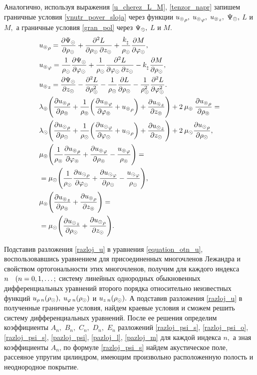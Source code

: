 Аналогично, используя выражения \eqref{u_cherez_L_M}, \eqref{tenzor_napr} запишем граничные условия \eqref{vnutr_pover_sloja} через функции ${u_\circledcirc}_\rho,$ ${u_\circledcirc}_\varphi,$ ${u_\circledcirc}_z,$ $ \Psi_\odot,$ $L$ и $M ,$ а граничные условия \eqref{gran_pol} через $\Psi_\odot,$ $L$ и $M.$
\begin{align}
&{u_\circledcirc}_\rho=\frac{\partial \Psi_\odot}{\partial\rho_\odot}+\frac{\partial^2 L}{\partial\rho_\odot\:\partial z_\odot}+\frac{k_{_\updownarrow}}{\rho_\odot}\frac{\partial M}{\partial \varphi_\odot},\\
&{u_\circledcirc}_\varphi=\frac{1}{\rho_\odot}\frac{\partial \Psi_\odot}{\partial \varphi_\odot}+\frac{1}{\rho_\odot}\frac{\partial^{2} L}{\partial\varphi_\odot\: \partial z_\odot}-k_{_\updownarrow}\frac{\partial M}{\partial \rho_\odot},\\
&{u_\circledcirc}_z=\frac{\partial\Psi_\odot}{\partial z_\odot}-\frac{\partial^{2} L}{\partial \rho^2_\odot}-\frac{1}{\rho_\odot}\frac{\partial L}{\partial \rho_\odot}-\frac{1}{\rho^2_\odot}\frac{\partial^2L}{\partial\varphi^2_\odot}.\\
&\lambda_\circledcirc\Biggl(\frac{\partial {u_\circledcirc}_{\rho}}{\partial \rho_\circledcirc}+\frac{1}{\rho_\circledcirc}\biggl(\frac{\partial {u_\circledcirc}_\varphi}{\partial\varphi_\circledcirc}+{u_\circledcirc}_{\rho}\biggr)+\frac{\partial {u_\circledcirc}_z}{\partial z_\circledcirc}\Biggr)+2\:\mu_\circledcirc\:\frac{\partial {u_\circledcirc}_{\rho}}{\partial \rho_\circledcirc}=\\
&\lambda_\odot\Biggl(\frac{\partial {u_\odot}_{\rho}}{\partial \rho_\odot}+\frac{1}{\rho_\odot}\biggl(\frac{\partial {u_\odot}_{\varphi}}{\partial\varphi_\odot}+{u_\odot}_{\rho}\biggr)+\frac{\partial {u_\odot}_{z}}{\partial z_\odot}\Biggr)+2\:\mu_\odot\frac{\partial {u_\odot}_{\rho}}{\partial \rho_\odot},\\
&\mu_\circledcirc\Biggl(\frac{1}{\rho_\circledcirc}\frac{\partial {u_\circledcirc}_{\rho}}{\partial\varphi_\circledcirc}+\frac{\partial {u_\circledcirc}_{\varphi}}{\partial \rho_\circledcirc}-\frac{{u_\circledcirc}_{\varphi}}{\rho_\circledcirc}\Biggr)=\\
&=\mu_\odot\Biggl(\frac{1}{\rho_\odot}\frac{\partial {u_\odot}_{\rho}}{\partial\varphi_\odot}+\frac{\partial {u_\odot}_{\varphi}}{\partial \rho_\odot}-\frac{{u_\odot}_{\varphi}}{\rho_\odot}\Biggr),\\
&\mu_\circledcirc\Biggl(\frac{\partial {u_\circledcirc}_z}{\partial \rho_\circledcirc}+\frac{\partial {u_\circledcirc}_{\rho}}{\partial z_\circledcirc}\Biggr)=\\
&=\mu_\odot\Biggl(\frac{\partial {u_\odot}_{z}}{\partial \rho_\odot}+\frac{\partial {u_\odot}_{\rho}}{\partial z_\odot}\Biggr).
\end{align}

Подставив разложения \eqref{razloj_u} в уравнения \eqref{equation_otn_u}, воспользовавшись уравнением для присоединенных многочленов Лежандра и свойством ортогональности этих многочленов, получим для каждого индекса $n \quad(n = 0,1,\ldots;$ систему линейных однородных обыкновенных дифференциальных уравнений второго порядка относительно неизвестных функций $u_{\rho\:n}(\rho_\odot),$ $u_{\varphi\:n}(\rho_\odot)$ и $u_{z\:n}(\rho_\odot).$ А подставив разложения \eqref{razloj_u} в полученные граничные условия, найдем краевые условия и сможем решить  систему дифференциальных уравнений. После ее решения определим коэффициенты $A_n,$ $B_n,$ $C_n,$ $D_n,$ $E_n$ разложений  \eqref{razloj_psi_s}, \eqref{razloj_psi_o}, \eqref{razloj_psi_s}, \eqref{pazloj_psi}, \eqref{pazloj_l}, \eqref{pazloj_m} для каждой индекса $n,$ а зная коэффициенты ${A}_{n}$, по формуле \eqref{razloj_psi_s} найдем акустическое поле, рассеяное упругим цилиндром, имеющим произвольно расположенную полость и неоднородное покрытие.
\newpage
